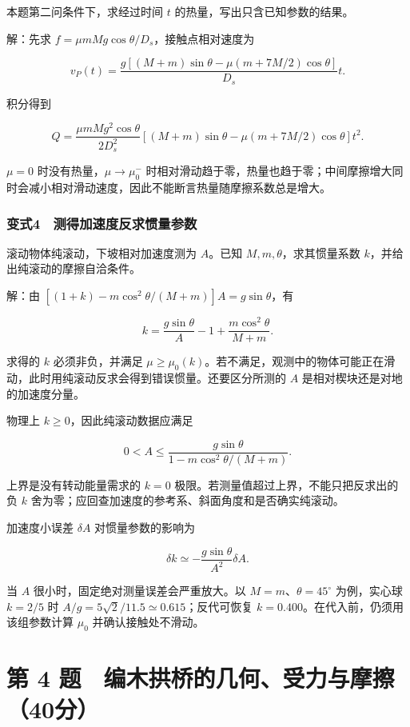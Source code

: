 \documentclass[12pt,a4paper,fontset=fandol]{ctexart}
\begin{document}
本题第二问条件下，求经过时间 \(t\) 的热量，写出只含已知参数的结果。

解：先求 \(f=\mu mMg\cos\theta/D_s\)，接触点相对速度为

\[v_P(t)=\frac{g[(M+m)\sin\theta-\mu(m+7M/2)\cos\theta]}{D_s}t.\]

积分得到

\[Q=\frac{\mu mMg^2\cos\theta}{2D_s^2}
[(M+m)\sin\theta-\mu(m+7M/2)\cos\theta]t^2.\]

\(\mu=0\) 时没有热量，\(\mu\to\mu_0^-\)
时相对滑动趋于零，热量也趋于零；中间摩擦增大同时会减小相对滑动速度，因此不能断言热量随摩擦系数总是增大。

\subsubsection{变式4　测得加速度反求惯量参数}\label{ux53d8ux5f0f4-ux6d4bux5f97ux52a0ux901fux5ea6ux53cdux6c42ux60efux91cfux53c2ux6570}

滚动物体纯滚动，下坡相对加速度测为 \(A\)。已知
\(M,m,\theta\)，求其惯量系数 \(k\)，并给出纯滚动的摩擦自洽条件。

解：由 \([(1+k)-m\cos^2\theta/(M+m)]A=g\sin\theta\)，有

\[\boxed{k=\frac{g\sin\theta}{A}-1+
\frac{m\cos^2\theta}{M+m}.}\]

求得的 \(k\) 必须非负，并满足
\(\mu\ge\mu_0(k)\)。若不满足，观测中的物体可能正在滑动，此时用纯滚动反求会得到错误惯量。还要区分所测的
\(A\) 是相对楔块还是对地的加速度分量。

物理上 \(k\ge0\)，因此纯滚动数据应满足

\[0<A\le
\frac{g\sin\theta}{1-m\cos^2\theta/(M+m)}.\]

上界是没有转动能量需求的 \(k=0\)
极限。若测量值超过上界，不能只把反求出的负 \(k\)
舍为零；应回查加速度的参考系、斜面角度和是否确实纯滚动。

加速度小误差 \(\delta A\) 对惯量参数的影响为

\[\delta k\simeq-\frac{g\sin\theta}{A^2}\delta A.\]

当 \(A\) 很小时，固定绝对测量误差会严重放大。以
\(M=m\)、\(\theta=45^\circ\) 为例，实心球 \(k=2/5\) 时
\(A/g=5\sqrt2/11.5\simeq0.615\)；反代可恢复
\(k=0.400\)。在代入前，仍须用该组参数计算 \(\mu_0\) 并确认接触处不滑动。

\clearpage

\section{第 4
题　编木拱桥的几何、受力与摩擦（40分）}\label{ux7b2c-4-ux9898-ux7f16ux6728ux62f1ux6865ux7684ux51e0ux4f55ux53d7ux529bux4e0eux6469ux64e640ux5206}
\end{document}

